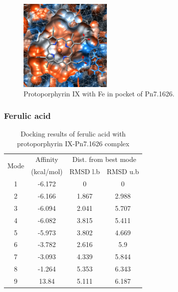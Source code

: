 \documentclass[12pt]{article}
\begin{document}
	\FloatBarrier
	
	\FloatBarrier
	\begin{figure}[h!]
		\centering
		\includegraphics[width=0.4\textwidth]{../5/propose/Dock/chimera.png}
		\caption{\centering Protoporphyrin IX with Fe in pocket of Pn7.1626.}
		\label{fig5p_4}
	\end{figure}
	\FloatBarrier
	
	\subsubsection{Ferulic acid}
	
	\begin{table}
		\centering
		\caption{\centering Docking results of ferulic acid with protoporphyrin IX-Pn7.1626 complex}
		\label{table5p_2}
		\begin{tabular}{cccc}
			\toprule
			\multirow{2}{*}{Mode} & Affinity & \multicolumn{2}{c}{Dist. from best mode}\\
			&  (kcal/mol) & RMSD l.b & RMSD u.b\\
			\midrule
			1 & -6.172   &       0   &       0\\
			2 & -6.166   &   1.867   &   2.988\\
			3 & -6.094   &   2.041   &   5.707\\
			4 & -6.082   &   3.815   &   5.411\\
			5 & -5.973   &   3.802   &   4.669\\
			6 & -3.782   &   2.616   &     5.9\\
			7 & -3.093   &   4.339   &   5.844\\
			8 & -1.264   &   5.353   &   6.343\\
			9 &  13.84   &   5.111   &   6.187\\
			\bottomrule
			
		\end{tabular}
	\end{table}
	
\end{document}
